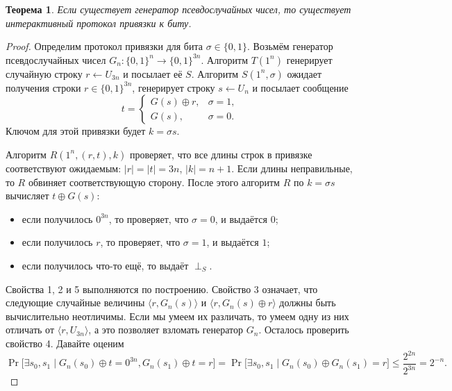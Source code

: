 \documentclass[12pt,a4paper]{article}
\newcommand{\bits}{\{0,1\}}
\theoremstyle{definition}
\theoremstyle{plain}
\newtheorem{theorem}{Теорема}[section]
\theoremstyle{remark}
\begin{document}
\begin{theorem}
Если существует генератор псевдослучайных чисел, то существует интерактивный протокол привязки к биту.
\end{theorem}
\begin{proof}
Определим протокол привязки для бита $\sigma\in\bits$. Возьмём генератор псевдослучайных чисел $G_n:\bits^n\to\bits^{3n}$. Алгоритм $T(1^n)$ генерирует случайную строку $r\gets U_{3n}$ и посылает её $S$.
Алгоритм $S(1^n, \sigma)$ ожидает получения строки $r\in\bits^{3n}$, генерирует строку $s\gets U_n$
и посылает сообщение 
$$t = 
\begin{cases} 
G(s)\oplus r, & \sigma = 1,\\ 
G(s),         & \sigma = 0.
\end{cases}
$$ 
Ключом для этой привязки будет $k = \sigma s$.

Алгоритм $R(1^n, (r,t), k)$ проверяет, что все длины строк в привязке соответствуют ожидаемым: $|r|=|t|=3n$, $|k|=n+1$. Если длины неправильные, то $R$ обвиняет соответствующую сторону. 
После этого алгоритм $R$ по $k=\sigma s$ вычисляет $t\oplus G(s)$:
\begin{itemize}
\item если получилось $0^{3n}$, то проверяет, что $\sigma=0$, и выдаётся $0$;
\item если получилось $r$,      то проверяет, что $\sigma=1$, и выдаётся $1$;
\item если получилось что-то ещё, то выдаёт $\perp_S$.
\end{itemize}

Свойства 1, 2 и 5 выполняются по построению.
Свойство 3 означает, что следующие случайные величины $\langle r,G_n(s)\rangle$ и 
$\langle r,G_n(s)\oplus r\rangle$
должны быть вычислительно неотличимы. Если мы умеем их различать, то умеем одну из
них отличать от $\langle r,U_{3n}\rangle$, а это позволяет взломать генератор $G_n$. Осталось проверить свойство 4.
Давайте оценим 
$$\Pr\bigl[\exists s_0, s_1 \mid G_n(s_0) \oplus t = 0^{3n}, G_n(s_1) \oplus t = r \bigr] =
\Pr\bigl[\exists s_0, s_1 \mid G_n(s_0) \oplus G_n(s_1) = r \bigr] \le \frac{2^{2n}}{2^{3n}} = 2^{-n}.$$
\end{proof}
\end{document}
